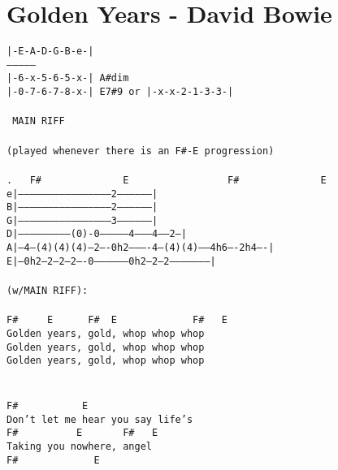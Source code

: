 \newpage
\section{Golden Years - David Bowie}
\label{Golden Years - David Bowie}
\texttt{|-E-A-D-G-B-e-|\\
---------------\\
|-6-x-5-6-5-x-|  A\#dim\\
|-0-7-6-7-8-x-|\ E7\#9\ or\ |-x-x-2-1-3-3-|\\
\\
\lbrack\ MAIN\ RIFF\rbrack\\
\\
(played\ whenever\ there\ is\ an\ F\#-E\ progression)\\
\\
.\ \ \ F\#\ \ \ \ \ \ \ \ \ \ \ \ \ \ E\ \ \ \ \ \ \ \ \ \ \ \ \ \ \ \ \ F\#\ \ \ \ \ \ \ \ \ \ \ \ \ \ E\\
e|-----------------------------------------------2------------------|\\
B|-----------------------------------------------2------------------|\\
G|-----------------------------------------------3------------------|\\
D|---------------------------(0)-0---------------4--------4------2--|\\
A|--4---(4)(4)(4)---2----0h2----------4---(4)(4)------4h6----2h4----|\\
E|--0h2--2--2--2----0-----------------0h2--2--2---------------------|\\
\\
(w/MAIN\ RIFF):\\
\\
F\#\ \ \ \ \ E\ \ \ \ \ \ F\#\ \ E\ \ \ \ \ \ \ \ \ \ \ \ \ F\#\ \ \ E\\
Golden\ years,\ gold,\ whop\ whop\ whop\\
Golden\ years,\ gold,\ whop\ whop\ whop\\
Golden\ years,\ gold,\ whop\ whop\ whop\\
\\
\\
F\#\ \ \ \ \ \ \ \ \ \ \ E\ \ \ \ \ \ \ \ \ \ \ \ \ \\
Don't\ let\ me\ hear\ you\ say\ life's\ \\
F\#\ \ \ \ \ \ \ \ \ \ E\ \ \ \ \ \ \ F\#\ \ \ E\ \\
Taking\ you\ nowhere,\ angel\\
F\#\ \ \ \ \ \ \ \ \ \ \ \ \ E\\
}
